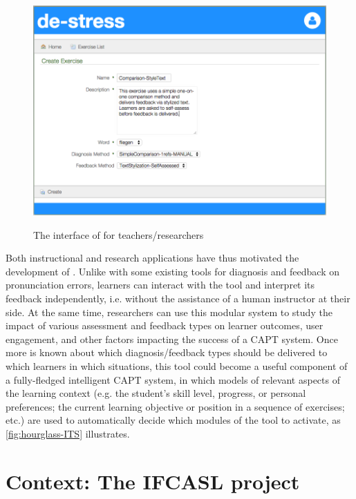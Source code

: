 	\begin{figure}[htbp]
		\centering
		\caption{The interface of  for teachers/researchers}
		\includegraphics[width=\textwidth]{img/screenshots/TeacherInterface-userIcon}
		\label{fig:interface:teacher}
	\end{figure}

Both instructional and research applications have thus motivated the development of .
Unlike with some existing tools for diagnosis and feedback on pronunciation errors, learners can interact with the tool and interpret its feedback independently, i.e. without the assistance of a human instructor at their side.
At the same time, researchers can use this modular system to study the impact of various assessment and feedback types on learner outcomes, user engagement, and other factors impacting the success of a CAPT system. 
%
Once more is known about which diagnosis/feedback types should be delivered to which learners in which situations, this tool could become a useful component of a fully-fledged intelligent CAPT system, in which 
models of relevant aspects of the learning context (e.g. the student's skill level, progress, or personal preferences; the current learning objective or position in a sequence of exercises; etc.)
are used to automatically decide which modules of the tool to activate, as \cref{fig:hourglass-ITS} illustrates.




\section{Context: The IFCASL project}
\label{sec:intro:ifcasl}

